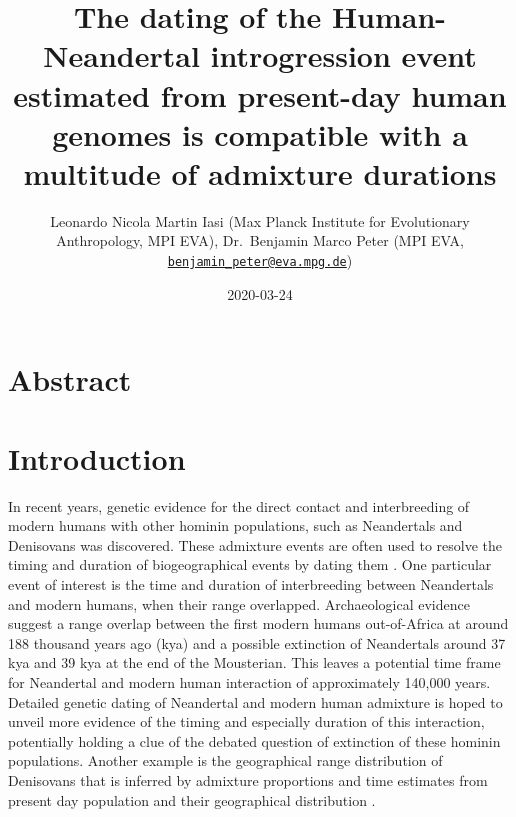 \documentclass[]{article}
\title{The dating of the Human-Neandertal introgression event estimated from present-day human genomes is compatible with a multitude of admixture durations}
\author{Leonardo Nicola Martin Iasi (Max Planck Institute for Evolutionary
Anthropology, MPI EVA), Dr.~Benjamin Marco Peter (MPI EVA,
\href{mailto:benjamin_peter@eva.mpg.de}{\nolinkurl{benjamin\_peter@eva.mpg.de}})}
\date{2020-03-24}
\begin{document}
\maketitle

\section{Abstract}\label{abstract}

\section{Introduction}\label{introduction}

In recent years, genetic evidence for the direct contact and interbreeding of modern humans with other hominin populations, such as Neandertals \citep{green_draft_2010,prufer_complete_2013,vernot_resurrecting_2014,fu_early_2015,fu_genome_2014,sankararaman_genomic_2014,prufer_high-coverage_2017} and Denisovans \citep{reich_genetic_2010,meyer_high-coverage_2012,sankararaman_combined_2016,vernot_excavating_2016,malaspinas_genomic_2016} was discovered. These admixture events are often used to resolve the timing and duration of biogeographical events by dating them \citep{sankararaman_date_2012,jacobs_multiple_2019,vyas_analyses_2019}. One particular event of interest is the time and duration of interbreeding between Neandertals and modern humans, when their range overlapped. Archaeological evidence suggest a range overlap between the first modern humans out-of-Africa at  around 188 thousand years ago (kya) \citep{stringer_when_2018,hershkovitz_earliest_2018} and a possible extinction of Neandertals around 37 kya \citep{zilhao_precise_2017} and 39 kya \citep{higham_timing_2014} at the end of the Mousterian. This leaves a potential time frame for Neandertal and modern human interaction of approximately 140,000 years. Detailed genetic dating of Neandertal and modern human admixture is hoped to unveil more evidence of the timing and especially duration of this interaction,
potentially holding a clue of the debated question of extinction of these hominin populations. Another example is the geographical range distribution of Denisovans that is inferred by admixture proportions and time estimates from present day population and their geographical distribution \citep{jacobs_multiple_2019}. 
\end{document}
